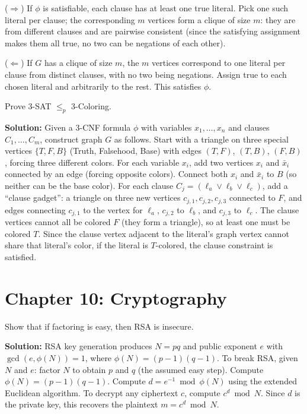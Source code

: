 ($\Rightarrow$) If $\phi$ is satisfiable, each clause has at least one true literal. Pick one such literal per clause; the corresponding $m$ vertices form a clique of size $m$: they are from different clauses and are pairwise consistent (since the satisfying assignment makes them all true, no two can be negations of each other).

($\Leftarrow$) If $G$ has a clique of size $m$, the $m$ vertices correspond to one literal per clause from distinct clauses, with no two being negations. Assign true to each chosen literal and arbitrarily to the rest. This satisfies $\phi$.

\begin{exercise}[Intermediate]
Prove 3-SAT $\le_p$ 3-Coloring.
\end{exercise}
\textbf{Solution:} Given a 3-CNF formula $\phi$ with variables $x_1, \ldots, x_n$ and clauses $C_1, \ldots, C_m$, construct graph $G$ as follows. Start with a triangle on three special vertices $\{T, F, B\}$ (Truth, Falsehood, Base) with edges $(T,F)$, $(T,B)$, $(F,B)$, forcing three different colors. For each variable $x_i$, add two vertices $x_i$ and $\bar{x}_i$ connected by an edge (forcing opposite colors). Connect both $x_i$ and $\bar{x}_i$ to $B$ (so neither can be the base color). For each clause $C_j = (\ell_a \lor \ell_b \lor \ell_c)$, add a ``clause gadget'': a triangle on three new vertices $c_{j,1}, c_{j,2}, c_{j,3}$ connected to $F$, and edges connecting $c_{j,1}$ to the vertex for $\ell_a$, $c_{j,2}$ to $\ell_b$, and $c_{j,3}$ to $\ell_c$. The clause vertices cannot all be colored $F$ (they form a triangle), so at least one must be colored $T$. Since the clause vertex adjacent to the literal's graph vertex cannot share that literal's color, if the literal is $T$-colored, the clause constraint is satisfied.

\section{Chapter 10: Cryptography}

\begin{exercise}[Basic]
Show that if factoring is easy, then RSA is insecure.
\end{exercise}
\textbf{Solution:} RSA key generation produces $N = pq$ and public exponent $e$ with $\gcd(e, \phi(N)) = 1$, where $\phi(N) = (p-1)(q-1)$. To break RSA, given $N$ and $e$: factor $N$ to obtain $p$ and $q$ (the assumed easy step). Compute $\phi(N) = (p-1)(q-1)$. Compute $d = e^{-1} \bmod \phi(N)$ using the extended Euclidean algorithm. To decrypt any ciphertext $c$, compute $c^d \bmod N$. Since $d$ is the private key, this recovers the plaintext $m = c^d \bmod N$.

